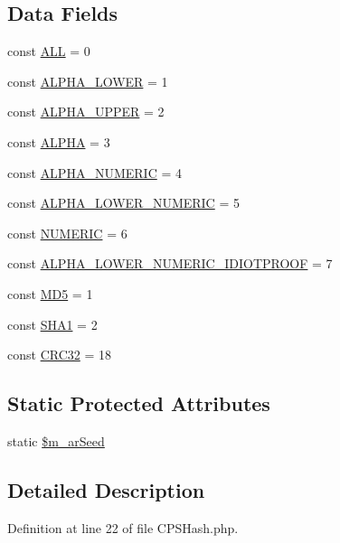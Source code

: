 \subsection*{Data Fields}
\begin{DoxyCompactItemize}
\item 
const \hyperlink{classCPSHash_ab56e734000051e5c12c8c5cf6d8d160d}{ALL} = 0
\item 
const \hyperlink{classCPSHash_a33fc57236d932860ab0ad8e8268e0c99}{ALPHA\_\-LOWER} = 1
\item 
const \hyperlink{classCPSHash_a13afa6f8ce77da9bd4a5af5d473d0d8b}{ALPHA\_\-UPPER} = 2
\item 
const \hyperlink{classCPSHash_a6bb7987358cd3de8e7c775094597e631}{ALPHA} = 3
\item 
const \hyperlink{classCPSHash_a1acce0cfa5c3723599af4c7e325b4312}{ALPHA\_\-NUMERIC} = 4
\item 
const \hyperlink{classCPSHash_a371814049e51cde466af6295bdfed4e3}{ALPHA\_\-LOWER\_\-NUMERIC} = 5
\item 
const \hyperlink{classCPSHash_a19cabff2391d99103d1bf11b0ed2972e}{NUMERIC} = 6
\item 
const \hyperlink{classCPSHash_aa15c0932a4cd96ab710478faace6ccb9}{ALPHA\_\-LOWER\_\-NUMERIC\_\-IDIOTPROOF} = 7
\item 
const \hyperlink{classCPSHash_a66be2064e952a39f04c0a54d83d1c779}{MD5} = 1
\item 
const \hyperlink{classCPSHash_a1ca7a04dcc397e382e3a4ee5e0e1b9a1}{SHA1} = 2
\item 
const \hyperlink{classCPSHash_aeeccfbe476a8ab58ea0c3382287ff0e9}{CRC32} = 18
\end{DoxyCompactItemize}
\subsection*{Static Protected Attributes}
\begin{DoxyCompactItemize}
\item 
static \hyperlink{classCPSHash_ad0ea7d21fa77c2440dae6c36137c1531}{\$m\_\-arSeed}
\end{DoxyCompactItemize}


\subsection{Detailed Description}


Definition at line 22 of file CPSHash.php.




